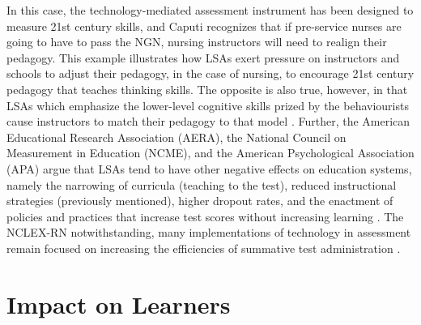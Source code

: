 \documentclass[
]{book}
\begin{document}
In this case, the technology-mediated assessment instrument has been designed to measure 21st century skills, and Caputi recognizes that if pre-service nurses are going to have to pass the NGN, nursing instructors will need to realign their pedagogy. This example illustrates how LSAs exert pressure on instructors and schools to adjust their pedagogy, in the case of nursing, to encourage 21st century pedagogy that teaches thinking skills. The opposite is also true, however, in that LSAs which emphasize the lower-level cognitive skills prized by the behaviourists cause instructors to match their pedagogy to that model \citep{caputiReflectionsNextGeneration2019, clarke-miduraAssessmentTechnologyChange2010, delucaExploringAssessmentCultures2021, pellegrinoPerspectivesIntegrationTechnology2010}. Further, the American Educational Research Association (AERA), the National Council on Measurement in Education (NCME), and the American Psychological Association (APA) argue that LSAs tend to have other negative effects on education systems, namely the narrowing of curricula (teaching to the test), reduced instructional strategies (previously mentioned), higher dropout rates, and the enactment of policies and practices that increase test scores without increasing learning \citeyearpar{aeraStandardsEducationalPsychological2014}. The NCLEX-RN notwithstanding, many implementations of technology in assessment remain focused on increasing the efficiencies of summative test administration \citep{broadfootAssessmentTwentyFirstCenturyLearning2016, pellegrinoPerspectivesIntegrationTechnology2010, webbAssessmentTwentyFirstCentury2018}.

\hypertarget{impact-on-learners}{%
\section{Impact on Learners}\label{impact-on-learners}}
\end{document}

